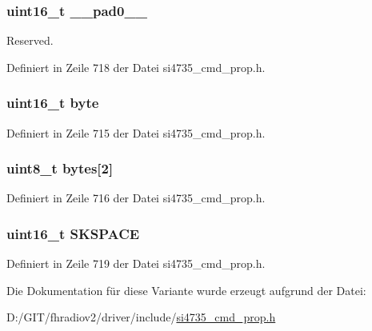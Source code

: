 \subsubsection[{\+\_\+\+\_\+pad0\+\_\+\+\_\+}]{\setlength{\rightskip}{0pt plus 5cm}uint16\+\_\+t \+\_\+\+\_\+pad0\+\_\+\+\_\+}\label{unionfm__seek__freq__spacing_a77132c2c26a75f5b8751b235cda23828}


Reserved. 



Definiert in Zeile 718 der Datei si4735\+\_\+cmd\+\_\+prop.\+h.

\hypertarget{unionfm__seek__freq__spacing_ab0549c1b5ea980a02e7eab77e21fea49}{}
\subsubsection[{byte}]{\setlength{\rightskip}{0pt plus 5cm}uint16\+\_\+t byte}\label{unionfm__seek__freq__spacing_ab0549c1b5ea980a02e7eab77e21fea49}


Definiert in Zeile 715 der Datei si4735\+\_\+cmd\+\_\+prop.\+h.

\hypertarget{unionfm__seek__freq__spacing_a46e4c05d20a047ec169f60d3167e912e}{}
\subsubsection[{bytes}]{\setlength{\rightskip}{0pt plus 5cm}uint8\+\_\+t bytes\mbox{[}2\mbox{]}}\label{unionfm__seek__freq__spacing_a46e4c05d20a047ec169f60d3167e912e}


Definiert in Zeile 716 der Datei si4735\+\_\+cmd\+\_\+prop.\+h.

\hypertarget{unionfm__seek__freq__spacing_a9f1888a9e6cdec1af67bb5764765df0b}{}
\subsubsection[{S\+K\+S\+P\+A\+C\+E}]{\setlength{\rightskip}{0pt plus 5cm}uint16\+\_\+t S\+K\+S\+P\+A\+C\+E}\label{unionfm__seek__freq__spacing_a9f1888a9e6cdec1af67bb5764765df0b}


Definiert in Zeile 719 der Datei si4735\+\_\+cmd\+\_\+prop.\+h.



Die Dokumentation für diese Variante wurde erzeugt aufgrund der Datei\+:\begin{DoxyCompactItemize}
\item 
D\+:/\+G\+I\+T/fhradiov2/driver/include/\hyperlink{si4735__cmd__prop_8h}{si4735\+\_\+cmd\+\_\+prop.\+h}\end{DoxyCompactItemize}
